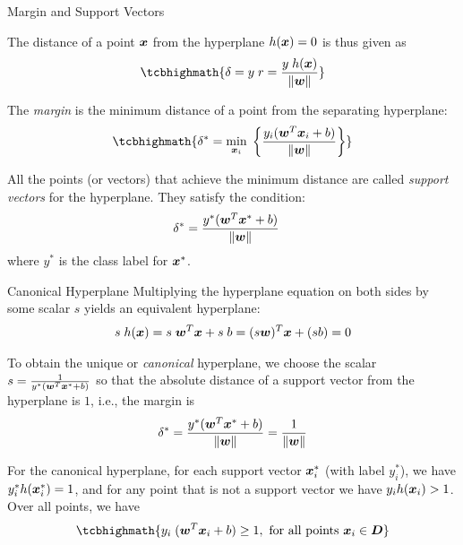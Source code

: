 \begin{frame}{Margin and Support Vectors}

The distance of a point ${\boldsymbol x}$ from the
hyperplane $h({\boldsymbol x})=0$ is thus given as
\begin{align*}
\tcbhighmath{
  \dist = y\; r = {y\; h(\bx) \over \| \bw \|}
}
\end{align*}

The {\em margin} is the minimum distance of a point from the 
separating
hyperplane:
\begin{align*}
\tcbhighmath{
  \dist^* = \min_{\bx_i} \; \lB\{ {y_i(\bw^T\bx_i + b) \over \| \bw \|} \rB\}
}
\end{align*}

All the points (or vectors) that achieve the minimum
distance are called {\em support vectors}
for the hyperplane. They satisfy the condition:
\begin{align*}
\delta^* & = {y^*({\boldsymbol w}^T{\boldsymbol x}^* + b) \over \| {\boldsymbol w} \|}
\end{align*}
where $y^*$ is the class label for ${\boldsymbol x}^*$.
\end{frame}


\begin{frame}{Canonical Hyperplane}
Multiplying the hyperplane equation on both sides by some scalar $s$ yields an equivalent
hyperplane:
\begin{align*}
    s \; h({\boldsymbol x}) = s\; {\boldsymbol w}^T{\boldsymbol x} + s\; b = (s{\boldsymbol w})^T{\boldsymbol x} + (sb) = 0
\end{align*}

\medskip
To obtain the unique or {\em canonical} hyperplane,
we choose the scalar $s={1 \over y^*({\boldsymbol w}^T{\boldsymbol x}^* + b)}$ so
that the absolute distance of a support vector from the
hyperplane is $1$, i.e., the margin is  
\begin{align*}
  \delta^* = {y^* ({\boldsymbol w}^T{\boldsymbol x}^* + b) \over \left\lVert{\boldsymbol w}\right\rVert} = {1 \over \| {\boldsymbol w} \|}
\end{align*}

\medskip
For the canonical hyperplane, for each support vector ${\boldsymbol x}^*_i$
(with label $y_i^*$), we have $y^*_i h({\boldsymbol x}^*_i) = 1$, and for any
point that is not a support vector we have \hbox{$y_i h({\boldsymbol x}_i) > 1$}.
Over all points, we have
\begin{align*}
\tcbhighmath{
  y_i \; (\bw^T\bx_i + b) \ge 1, \mbox{ for all points } \bx_i \in \bD
}
\end{align*}
\end{frame}


